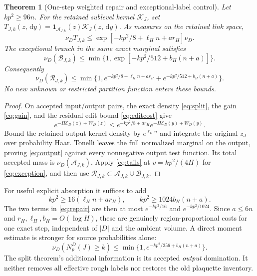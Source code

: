 \documentclass[11pt]{article}
\newtheorem{theorem}{Theorem}[section]
\theoremstyle{definition}
\theoremstyle{remark}
\newcommand{\one}{\mathbf1}
\newcommand{\dd}{\,\mathrm d}
\begin{document}
\begin{theorem}[One-step weighted repair and exceptional-label control]
\label{thm:repair}
Let $kp^2\ge96n$. For the retained sublevel kernel $\mathcal K_J$,
set $T_{J,k}(z,\dd y)=\one_{\mathcal A_{J,k}}(z)\mathcal K_J(z,\dd y)$.
As measures on the retained link space,
\begin{equation}
 \nu_D T_{J,k}\le
 \exp[-kp^2/8+\ell_Hn+a r_H]\nu_D.
 \label{eq:output}
\end{equation}
The exceptional branch in the \emph{same exact marginal} satisfies
\begin{equation}
 \nu_D(\mathcal B_{J,k})\le
 \min\{1,\exp[-kp^2/512+b_H(n+a)]\}.
 \label{eq:exception}
\end{equation}
Consequently
\begin{equation}
 \nu_D(\mathcal R_{J,k})\le\min\{1,
 e^{-kp^2/8+\ell_Hn+a r_H}
 +e^{-kp^2/512+b_H(n+a)}\}.
 \label{eq:repair}
\end{equation}
No new unknown or restricted partition function enters these bounds.
\end{theorem}
\begin{proof}
On accepted input/output pairs, the exact density \eqref{eq:split},
the gain \eqref{eq:gain}, and the residual edit bound \eqref{eq:editcost}
give
\[
 e^{-H\mathcal E_D(z)+W_D(z)}
 \le e^{-kp^2/8+a r_H}e^{-H\mathcal E_D(y)+W_D(y)}.
\]
Bound the retained-output kernel density by $e^{\ell_Hn}$ and integrate
the original $z_J$ over probability Haar. Tonelli leaves the full
normalized marginal on the output, proving \eqref{eq:output} against
every nonnegative output test function. Its total accepted mass is
$\nu_D(\mathcal A_{J,k})$. Apply \eqref{eq:tails} at $v=kp^2/(4H)$
for \eqref{eq:exception}, and then use
$\mathcal R_{J,k}\subset\mathcal A_{J,k}\cup\mathcal B_{J,k}$.
\end{proof}
For useful explicit absorption it suffices to add
\begin{equation}
 kp^2\ge16(\ell_Hn+a r_H),\qquad
 kp^2\ge1024b_H(n+a).
 \label{eq:absorb}
\end{equation}
The two terms in \eqref{eq:repair} are then at most
$e^{-kp^2/16}$ and $e^{-kp^2/1024}$. Since $a\le6n$ and
$r_H,\ell_H,b_H=O(\log H)$, these are genuinely region-proportional
costs for one exact step, independent of $|D|$ and the ambient volume.
A direct moment estimate is stronger for source probabilities alone:
\begin{equation}
 \nu_D(N_p^D(J)\ge k)
 \le\min\{1,e^{-kp^2/256+b_H(n+a)}\}.
 \label{eq:rough}
\end{equation}
The split theorem's additional information is its accepted \emph{output}
domination. It neither removes all effective rough labels nor restores
the old plaquette inventory.
\end{document}
